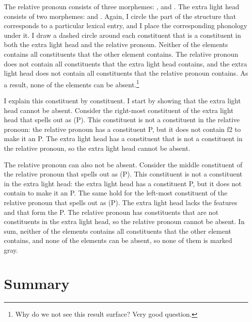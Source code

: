 The relative pronoun consists of three morphemes: ,  and .
The extra light head consists of two morphemes:  and .
Again, I circle the part of the structure that corresponds to a particular lexical entry, and I place the corresponding phonology under it.
I draw a dashed circle around each constituent that is a constituent in both the extra light head and the relative pronoun.
Neither of the elements contains all constituents that the other element contains. The relative pronoun does not contain all constituents that the extra light head contains, and the extra light head does not contain all constituents that the relative pronoun contains. As a result, none of the elements can be absent.\footnote{
Why do we not see this result surface? Very good question.
}

I explain this constituent by constituent.
I start by showing that the extra light head cannot be absent.
Consider the right-most constituent of the extra light head that spells out as  (P). This constituent is not a constituent in the relative pronoun: the relative pronoun has a constituent P, but it does not contain \ac{f}2 to make it an P.
The extra light head has a constituent that is not a constituent in the relative pronoun, so the extra light head cannot be absent.

The relative pronoun can also not be absent.
Consider the middle constituent of the relative pronoun that spells out as  (P). This constituent is not a constituent in the extra light head: the extra light head has a constituent P, but it does not contain  to make it an P.
The same hold for the left-most constituent of the relative pronoun that spells out as  (P). The extra light head lacks the features  and  that form the P.
The relative pronoun has constituents that are not constituents in the extra light head, so the relative pronoun cannot be absent.
In sum, neither of the elements contains all constituents that the other element contains, and none of the elements can be absent, so none of them is marked gray.

\section{Summary}
